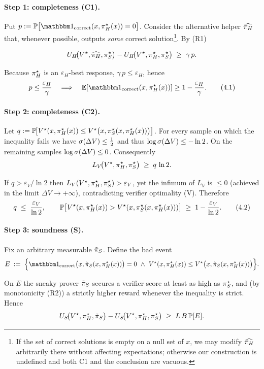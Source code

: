 \paragraph{Step 1: completeness (C1).}
Put
$p:=\PP\bigl[\corr(x,\dH^\star(x))=0\bigr]$.
Consider the alternative helper $\widehat{\pi_H}$ that, whenever possible,
outputs \emph{some} correct solution\footnote{If the set of correct
solutions is empty on a null set of $x$, we may modify $\widehat{\pi_H}$
arbitrarily there without affecting expectations; otherwise our
construction is undefined and both C1 and the conclusion are vacuous.}.
By (R1)

\[
U_H\!\bigl(V^\star,\widehat{\pi_H},\pi_S^{\star}\bigr)
-
U_H\!\bigl(V^\star,\pi_H^\star,\pi_S^{\star}\bigr)
\;\ge\;
\gamma\,p.
\]

Because $\pi_H^\star$ is an $\varepsilon_H$-best response,
$\gamma\,p\le\varepsilon_H$, hence
\[
p\le\frac{\varepsilon_H}{\gamma}\quad\Longrightarrow\quad
\EE[\corr(x,\dH^\star(x))]\ge 1-\frac{\varepsilon_H}{\gamma}.
\tag{4.1}
\]

\paragraph{Step 2: completeness (C2).}
Let
$q:=\mathbb P\!\bigl[V^\star(x,\pi_H^\star(x))\le V^\star\bigl(x,\pi_S^\star(x,\pi_H^\star(x))\bigr)\bigr]$.
For every sample on which the inequality fails we have
$\sigma(\Delta V)\le\frac12$ and thus $\log\sigma(\Delta V)\le-\ln 2$.
On the remaining samples $\log\sigma(\Delta V)\le 0$.
Consequently
\[
L_V\!\bigl(V^\star,\pi_H^\star,\pi_S^\star\bigr)
\;\ge\;
q\,\ln 2.
\]

If $q>\varepsilon_V/\ln 2$ then
$L_V(V^\star,\pi_H^\star,\pi_S^\star)>\varepsilon_V$,
yet the infimum of $L_V$ is $\le 0$
(achieved in the limit $\Delta V\to+\infty$),
contradicting verifier optimality (V).
Therefore
\[
q\;\le\;\frac{\varepsilon_V}{\ln 2},
\qquad
\mathbb P\bigl[V^\star(x,\pi_H^\star(x))>V^\star(x,\pi_S^\star(x,\pi_H^\star(x)))\bigr]
\;\ge\;1-\frac{\varepsilon_V}{\ln 2}.
\tag{4.2}
\]

\paragraph{Step 3: soundness (S).}
Fix an arbitrary measurable $\tilde{\pi}_S$.
Define the bad event
\[
E\;:=\;\Bigl\{
\corr\bigl(x,\dSt(x,\dH^\star(x))\bigr)=0
\ \wedge\
V^\star(x,\dH^\star(x))\le
V^\star\bigl(x,\dSt(x,\dH^\star(x))\bigr)
\Bigr\}.
\]

On $E$ the sneaky prover $\tilde{\pi}_S$ secures a verifier score at least as
high as $\pi_S^\star$, and (by monotonicity (R2)) a strictly higher reward
whenever the inequality is strict.
Hence
\[
U_S\!\bigl(V^\star,\pi_H^\star,\tilde{\pi}_S\bigr)
-
U_S\!\bigl(V^\star,\pi_H^\star,\pi_S^\star\bigr)
\;\ge\;
L\,B\,\mathbb P[E].
\]

